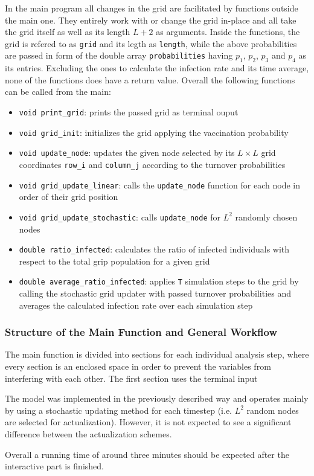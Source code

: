 In the main program all changes in the grid are facilitated by functions outside the main one. They entirely work with or change the grid in-place and all take the grid itself as well as its length $L+2$ as arguments.
Inside the functions, the grid is refered to as \texttt{grid} and its legth as \texttt{length}, while the above probabilities are passed in form of the double array \texttt{probabilities} having $p_1$, $p_2$, $p_3$ 
and $p_4$ as its entries. Excluding the ones to calculate the infection rate and its time average, none of the functions does have a return value. Overall the following functions can be called from the main:
\begin{itemize}
    \item \texttt{void print\_grid}: prints the passed grid as terminal ouput
    \item \texttt{void grid\_init}: initializes the grid applying the vaccination probability
    \item \texttt{void update\_node}: updates the given node selected by its $L\times L$ grid coordinates \texttt{row\_i} and \texttt{column\_j} according to the turnover probabilities
    \item \texttt{void grid\_update\_linear}: calls the \texttt{update\_node} function for each node in order of their grid position
    \item \texttt{void grid\_update\_stochastic}: calls \texttt{update\_node} for $L^2$ randomly chosen nodes
    \item \texttt{double ratio\_infected}: calculates the ratio of infected individuals with respect to the total grip population for a given grid
    \item \texttt{double average\_ratio\_infected}: applies \texttt{T} simulation steps to the grid by calling the stochastic grid updater with passed turnover probabilities 
    and averages the calculated infection rate over each simulation step
\end{itemize}


\subsubsection{Structure of the Main Function and General Workflow}

The main function is divided into sections for each individual analysis step, where every section is an enclosed space in order to prevent the variables from interfering with each other.
The first section uses the terminal input

The model was implemented in the previously described way and operates mainly by using a stochastic updating method for each timestep (i.e. $L^2$ random nodes are selected for actualization). 
However, it is not expected to see a significant difference between the actualization schemes.

Overall a running time of around three minutes should be expected after the interactive part is finished.


